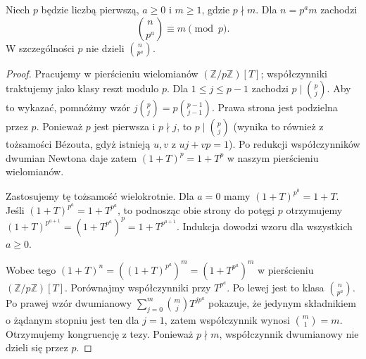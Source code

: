 \begin{lemat}
\label{aa:lem:dwumian-p}
Niech $p$ będzie liczbą pierwszą, $a\ge0$ i $m\ge1$,
gdzie $p\nmid m$. Dla $n=p^a m$ zachodzi
\[
 \binom{n}{p^a}\equiv m\pmod p.
\]
W szczególności $p$ nie dzieli $\binom{n}{p^a}$.
\end{lemat}
\begin{proof}
Pracujemy w pierścieniu wielomianów
$(\mathbb Z/p\mathbb Z)[T]$; współczynniki traktujemy
jako klasy reszt modulo $p$.
Dla $1\le j\le p-1$ zachodzi $p\mid\binom pj$.
Aby to wykazać, pomnóżmy wzór
$j\binom pj=p\binom{p-1}{j-1}$.
Prawa strona jest podzielna przez $p$.
Ponieważ $p$ jest pierwsza i $p\nmid j$,
to $p\mid\binom pj$ (wynika to również z tożsamości
Bézouta, gdyż istnieją $u,v$ z $uj+vp=1$).
Po redukcji współczynników dwumian Newtona daje zatem
$(1+T)^p=1+T^p$ w naszym pierścieniu wielomianów.

Zastosujemy tę tożsamość wielokrotnie.
Dla $a=0$ mamy $(1+T)^{p^0}=1+T$.
Jeśli $(1+T)^{p^a}=1+T^{p^a}$, to podnosząc obie
strony do potęgi $p$ otrzymujemy
$(1+T)^{p^{a+1}}=(1+T^{p^a})^p=1+T^{p^{a+1}}$.
Indukcja dowodzi wzoru dla wszystkich $a\ge0$.

Wobec tego
$(1+T)^n=((1+T)^{p^a})^m=(1+T^{p^a})^m$
w pierścieniu $(\mathbb Z/p\mathbb Z)[T]$.
Porównajmy współczynniki przy $T^{p^a}$.
Po lewej jest to klasa $\binom{n}{p^a}$.
Po prawej wzór dwumianowy
$\sum_{j=0}^m\binom mj T^{jp^a}$ pokazuje,
że jedynym składnikiem o żądanym stopniu jest ten dla $j=1$,
zatem współczynnik wynosi $\binom m1=m$.
Otrzymujemy kongruencję z tezy. Ponieważ $p\nmid m$,
współczynnik dwumianowy nie dzieli się przez $p$.
\end{proof}

